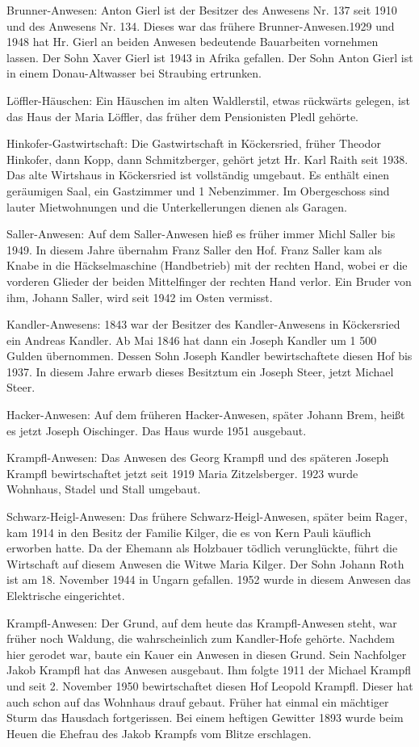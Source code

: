 \documentclass{book}
\begin{document}
Brunner-Anwesen: Anton Gierl ist der Besitzer des Anwesens Nr. 137 seit 1910 und
des Anwesens Nr. 134. Dieses war das frühere Brunner-Anwesen.1929 und 1948 hat
Hr. Gierl an beiden Anwesen bedeutende Bauarbeiten vornehmen lassen. Der Sohn
Xaver Gierl ist 1943 in Afrika gefallen. Der Sohn Anton Gierl ist in einem
Donau-Altwasser bei Straubing ertrunken.

Löffler-Häuschen: Ein Häuschen im alten Waldlerstil, etwas rückwärts gelegen,
ist das Haus der Maria Löffler, das früher dem Pensionisten Pledl gehörte.

Hinkofer-Gastwirtschaft: Die Gastwirtschaft in Köckersried, früher Theodor
Hinkofer, dann Kopp, dann Schmitzberger, gehört jetzt Hr. Karl Raith seit 1938.
Das alte Wirtshaus in Köckersried ist vollständig umgebaut. Es enthält einen
geräumigen Saal, ein Gastzimmer und 1 Nebenzimmer. Im Obergeschoss sind lauter
Mietwohnungen und die Unterkellerungen dienen als Garagen.

Saller-Anwesen: Auf dem Saller-Anwesen hieß es früher immer Michl Saller bis
1949. In diesem Jahre übernahm Franz Saller den Hof. Franz Saller kam als Knabe
in die Häckselmaschine (Handbetrieb) mit der rechten Hand, wobei er die vorderen
Glieder der beiden Mittelfinger der rechten Hand verlor. Ein Bruder von ihm,
Johann Saller, wird seit 1942 im Osten vermisst.

Kandler-Anwesens: 1843 war der Besitzer des Kandler-Anwesens in Köckersried ein
Andreas Kandler. Ab Mai 1846 hat dann ein Joseph Kandler um 1 500 Gulden
übernommen. Dessen Sohn Joseph Kandler bewirtschaftete diesen Hof bis 1937. In
diesem Jahre erwarb dieses Besitztum ein Joseph Steer, jetzt Michael Steer.

Hacker-Anwesen: Auf dem früheren Hacker-Anwesen, später Johann Brem, heißt es
jetzt Joseph Oischinger. Das Haus wurde 1951 ausgebaut.

Krampfl-Anwesen: Das Anwesen des Georg Krampfl und des späteren Joseph Krampfl
bewirtschaftet jetzt seit 1919 Maria Zitzelsberger. 1923 wurde Wohnhaus, Stadel
und Stall umgebaut.

Schwarz-Heigl-Anwesen: Das frühere Schwarz-Heigl-Anwesen, später beim Rager, kam
1914 in den Besitz der Familie Kilger, die es von Kern Pauli käuflich erworben
hatte. Da der Ehemann als Holzbauer tödlich verunglückte, führt die Wirtschaft
auf diesem Anwesen die Witwe Maria Kilger. Der Sohn Johann Roth ist am 18.
November 1944 in Ungarn gefallen. 1952 wurde in diesem Anwesen das Elektrische
eingerichtet.

Krampfl-Anwesen: Der Grund, auf dem heute das Krampfl-Anwesen steht, war früher
noch Waldung, die wahrscheinlich zum Kandler-Hofe gehörte. Nachdem hier gerodet
war, baute ein Kauer ein Anwesen in diesen Grund. Sein Nachfolger Jakob Krampfl
hat das Anwesen ausgebaut. Ihm folgte 1911 der Michael Krampfl und seit 2.
November 1950 bewirtschaftet diesen Hof Leopold Krampfl. Dieser hat auch schon
auf das Wohnhaus drauf gebaut. Früher hat einmal ein mächtiger Sturm das
Hausdach fortgerissen. Bei einem heftigen Gewitter 1893 wurde beim Heuen die
Ehefrau des Jakob Krampfs vom Blitze erschlagen.
\end{document}
